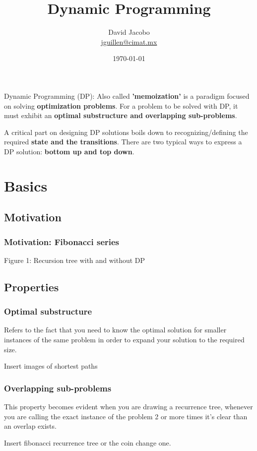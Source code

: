 \documentclass[article]{beamer}
\title{Dynamic Programming}
\author{David Jacobo \\ \href{mailto:jguillen@cimat.mx}{jguillen@cimat.mx}}
\date{\scriptsize{\today}}
\begin{document}
\maketitle

\begin{frame}
\begin{block}{Dynamic Programming (DP):}
	Also called \textbf{'memoization'} is a paradigm focused on solving \textbf{optimization 
	problems}. For a problem to be solved with DP, it must exhibit an \textbf{optimal substructure and
	overlapping sub-problems}.
	
	\vspace{8mm}
	
	A critical part on designing DP solutions boils down to recognizing/defining the 
	required \textbf{state and the transitions}. There are two typical ways to express a DP solution: \textbf{bottom up and top down}.
\end{block}
\end{frame}


\section{Basics}

\subsection{Motivation}
\begin{frame}
	\frametitle{Motivation: Fibonacci series}
	Figure 1: Recursion tree with and without DP
\end{frame}

\subsection{Properties}
\begin{frame}
	\frametitle{Optimal substructure}
	Refers to the fact that you need to know the optimal solution for smaller instances of the same problem in order to expand your solution to the required size.
	
	\vspace{8mm}
	
	Insert images of shortest paths	
\end{frame}

\begin{frame}
	\frametitle{Overlapping sub-problems}
	This property becomes evident when you are drawing a recurrence tree, whenever you are calling the exact instance of the problem 2 or more times it's clear than an overlap exists.
	
	\vspace{8mm}
	
	Insert fibonacci recurrence tree or the coin change one.	
\end{frame}
\end{document}

